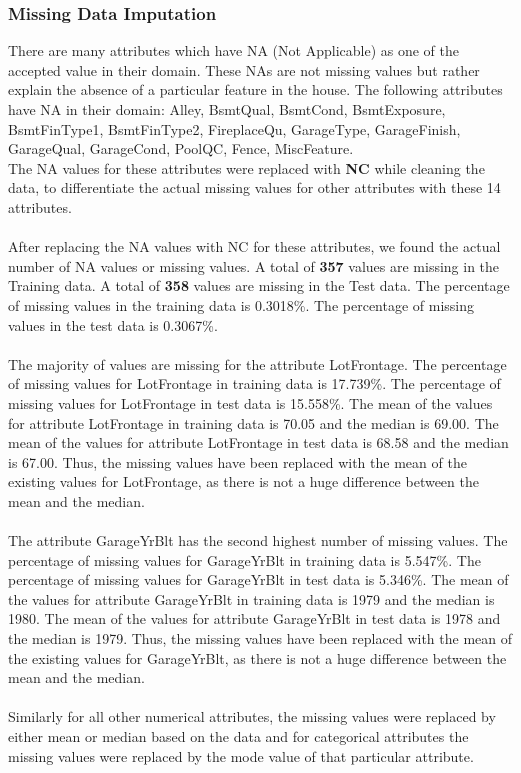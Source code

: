 \documentclass[fleqn,10pt]{SelfArx} %
\begin{document}
\subsubsection{Missing Data Imputation}
There are many attributes which have NA (Not Applicable) as one of the accepted value in their domain. These NA\textquotesingle s are not missing values but rather explain the absence of a particular feature in the house. The following attributes have NA in their domain:
Alley, BsmtQual, BsmtCond, BsmtExposure, BsmtFinType1, BsmtFinType2, FireplaceQu, GarageType, GarageFinish, GarageQual, GarageCond, PoolQC, Fence, MiscFeature.
\\ The NA values for these attributes were replaced with \textbf{NC} while cleaning the data, to differentiate the actual missing values for other attributes with these 14 attributes.
\\ \\ After replacing the NA values with NC for these attributes, we found the actual number of NA values or missing values.
A total of \textbf{357} values are missing in the Training data.
A total of \textbf{358} values are missing in the Test data.
The percentage of missing values in the training data is 0.3018\%.
The percentage of missing values in the test data is 0.3067\%.
\\ \\The majority of values are missing for the attribute LotFrontage.
The percentage of missing values for LotFrontage in training data is 17.739\%.
The percentage of missing values for LotFrontage in test data is 15.558\%.
The mean of the values for attribute LotFrontage in training data is 70.05 and the median is 69.00.
The mean of the values for attribute LotFrontage in test data is 68.58 and the median is 67.00.
Thus, the missing values have been replaced with the mean of the existing values for LotFrontage, as there is not a huge difference between the mean and the median.
\\ \\The attribute GarageYrBlt has the second highest number of missing values.
The percentage of missing values for GarageYrBlt in training data is 5.547\%.
The percentage of missing values for GarageYrBlt in test data is 5.346\%.
The mean of the values for attribute GarageYrBlt in training data is 1979 and the median is 1980.
The mean of the values for attribute GarageYrBlt in test data is 1978 and the median is 1979.
Thus, the missing values have been replaced with the mean of the existing values for GarageYrBlt, as there is not a huge difference between the mean and the median.
\\ \\ Similarly for all other numerical attributes, the missing values were replaced by either mean or median based on the data and for categorical attributes the missing values were replaced by the mode value of that particular attribute.
%
\end{document}
